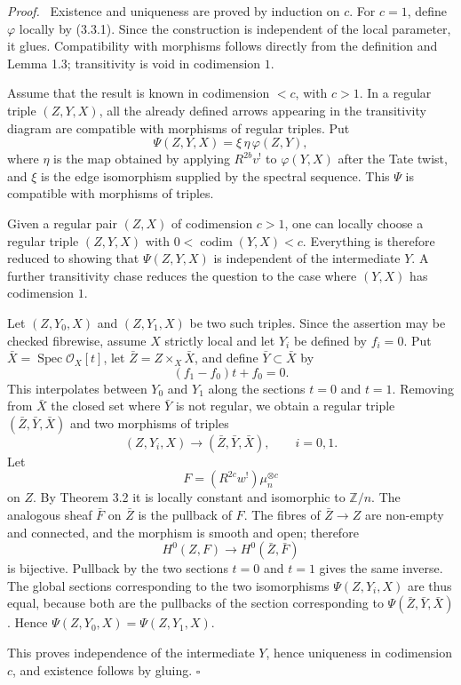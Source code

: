 \documentclass[12pt]{article}
\newcommand{\Oo}{\mathcal O}
\newcommand{\ZZ}{\mathbb Z}
\DeclareMathOperator{\Spec}{Spec}
\DeclareMathOperator{\codim}{codim}
\newcommand{\qedtext}{\hfill\(\square\)}
\newenvironment{prooftext}[1][Proof]{\par\noindent\emph{#1.}\ }{\par\medskip}
\begin{document}
\begin{prooftext}
Existence and uniqueness are proved by induction on $c$. For $c=1$, define $\varphi$ locally by (3.3.1). Since the construction is independent of the local parameter, it glues. Compatibility with morphisms follows directly from the definition and Lemma 1.3; transitivity is void in codimension $1$.

Assume that the result is known in codimension $<c$, with $c>1$. In a regular triple $(Z,Y,X)$, all the already defined arrows appearing in the transitivity diagram are compatible with morphisms of regular triples. Put
\[
   \Psi(Z,Y,X)=\xi\,\eta\,\varphi(Z,Y),
\]
where $\eta$ is the map obtained by applying $R^{2b}v^!$ to $\varphi(Y,X)$ after the Tate twist, and $\xi$ is the edge isomorphism supplied by the spectral sequence. This $\Psi$ is compatible with morphisms of triples.

Given a regular pair $(Z,X)$ of codimension $c>1$, one can locally choose a regular triple $(Z,Y,X)$ with $0<\codim(Y,X)<c$. Everything is therefore reduced to showing that $\Psi(Z,Y,X)$ is independent of the intermediate $Y$. A further transitivity chase reduces the question to the case where $(Y,X)$ has codimension $1$.

Let $(Z,Y_0,X)$ and $(Z,Y_1,X)$ be two such triples. Since the assertion may be checked fibrewise, assume $X$ strictly local and let $Y_i$ be defined by $f_i=0$. Put $\bar X=\Spec \Oo_X[t]$, let $\bar Z=Z\times_X\bar X$, and define $\bar Y\subset\bar X$ by
\[
   (f_1-f_0)t+f_0=0.
\]
This interpolates between $Y_0$ and $Y_1$ along the sections $t=0$ and $t=1$. Removing from $\bar X$ the closed set where $\bar Y$ is not regular, we obtain a regular triple $(\bar Z,\bar Y,\bar X)$ and two morphisms of triples
\[
   (Z,Y_i,X)\longrightarrow(\bar Z,\bar Y,\bar X),\qquad i=0,1.
\]
Let
\[
   F=(R^{2c}w^!)\mu_n^{\otimes c}
\]
on $Z$. By Theorem 3.2 it is locally constant and isomorphic to $\ZZ/n$. The analogous sheaf $\bar F$ on $\bar Z$ is the pullback of $F$. The fibres of $\bar Z\to Z$ are non-empty and connected, and the morphism is smooth and open; therefore
\[
   H^0(Z,F)\longrightarrow H^0(\bar Z,\bar F)
\]
is bijective. Pullback by the two sections $t=0$ and $t=1$ gives the same inverse. The global sections corresponding to the two isomorphisms $\Psi(Z,Y_i,X)$ are thus equal, because both are the pullbacks of the section corresponding to $\Psi(\bar Z,\bar Y,\bar X)$. Hence $\Psi(Z,Y_0,X)=\Psi(Z,Y_1,X)$.

This proves independence of the intermediate $Y$, hence uniqueness in codimension $c$, and existence follows by gluing. \qedtext
\end{prooftext}
\end{document}
